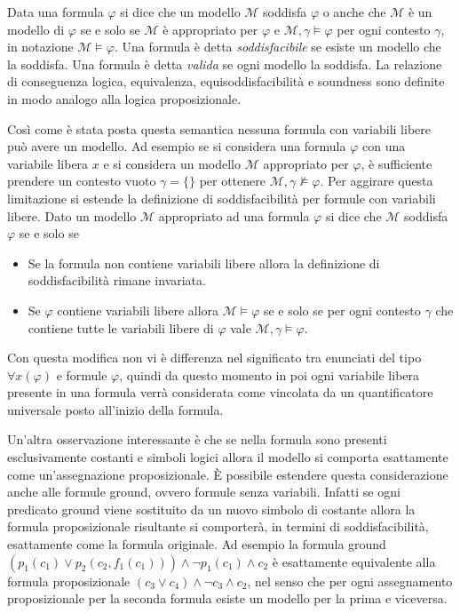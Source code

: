 \documentclass[./main.tex]{subfiles}
\begin{document}
Data una formula $\varphi$ si dice che un modello $\mathcal{M}$ soddisfa $\varphi$ o anche che $\mathcal{M}$ 
è un modello di $\varphi$ se e solo se $\mathcal{M}$ è appropriato per $\varphi$ e $\mathcal{M}, \gamma \models \varphi$ per ogni contesto $\gamma$,
in notazione $\mathcal{M} \models \varphi$. Una formula è detta \textit{soddisfacibile} se esiste un modello che la soddisfa.
Una formula è detta \textit{valida} se ogni modello la soddisfa.
La relazione di conseguenza logica, equivalenza, equisoddisfacibilità e soundness sono definite in modo analogo alla logica proposizionale.


Così come è stata posta questa semantica nessuna formula con variabili libere può avere un modello.
Ad esempio se si considera una formula $\varphi$ con una variabile libera $x$ e si considera un modello $\mathcal{M}$ appropriato per $\varphi$,
è sufficiente prendere un contesto vuoto $\gamma = \{\}$ per ottenere $\mathcal{M}, \gamma \not\models \varphi$.
Per aggirare questa limitazione si estende la definizione di soddisfacibilità per formule con variabili libere.
Dato un modello $\mathcal{M}$ appropriato ad una formula $\varphi$ si dice che $\mathcal{M}$ soddisfa $\varphi$ se e solo se
\begin{itemize}
  \item Se la formula non contiene variabili libere allora la definizione di soddisfacibilità rimane invariata.
  \item Se $\varphi$ contiene variabili libere allora $\mathcal{M} \models \varphi$ se e solo se
  per ogni contesto $\gamma$ che contiene tutte le variabili libere di $\varphi$ vale $\mathcal{M}, \gamma \models \varphi$.
\end{itemize}

Con questa modifica non vi è differenza nel significato tra enunciati del tipo $\forall x (\varphi)$ e formule $\varphi$,
quindi da questo momento in poi ogni variabile libera presente in una formula verrà considerata come vincolata da un quantificatore universale posto all'inizio della formula.

Un'altra osservazione interessante è che se nella formula sono presenti esclusivamente costanti e simboli logici allora il modello si comporta 
esattamente come un'assegnazione proposizionale. È possibile estendere questa considerazione anche alle formule ground, ovvero formule senza variabili.
Infatti se ogni predicato ground viene sostituito da un nuovo simbolo di costante allora la formula proposizionale risultante si comporterà, in termini di soddisfacibilità,
esattamente come la formula originale. Ad esempio la formula ground $(p_1(c_1) \lor p_2(c_2, f_1(c_1))) \land \lnot p_1(c_1) \land c_2$ 
è esattamente equivalente alla formula proposizionale $(c_3 \lor c_4) \land \lnot c_3 \land c_2$, nel senso che per ogni assegnamento proposizionale per la seconda formula
esiste un modello per la prima e viceversa.
\end{document}
